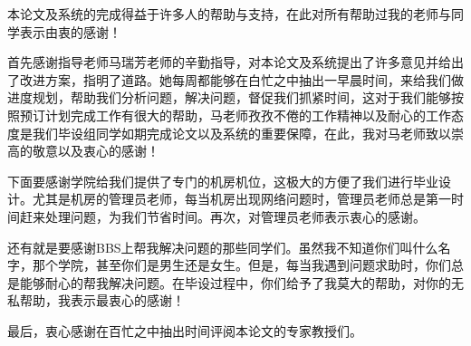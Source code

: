 \documentclass[twoside, xetex]{report}
\begin{document}
本论文及系统的完成得益于许多人的帮助与支持，在此对所有帮助过我的老师与同学表示由衷的感谢！

首先感谢指导老师马瑞芳老师的辛勤指导，对本论文及系统提出了许多意见并给出了改进方案，指明了道路。她每周都能够在白忙之中抽出一早晨时间，来给我们做进度规划，帮助我们分析问题，解决问题，督促我们抓紧时间，这对于我们能够按照预订计划完成工作有很大的帮助，马老师孜孜不倦的工作精神以及耐心的工作态度是我们毕设组同学如期完成论文以及系统的重要保障，在此，我对马老师致以崇高的敬意以及衷心的感谢！

下面要感谢学院给我们提供了专门的机房机位，这极大的方便了我们进行毕业设计。尤其是机房的管理员老师，每当机房出现网络问题时，管理员老师总是第一时间赶来处理问题，为我们节省时间。再次，对管理员老师表示衷心的感谢。

还有就是要感谢BBS上帮我解决问题的那些同学们。虽然我不知道你们叫什么名字，那个学院，甚至你们是男生还是女生。但是，每当我遇到问题求助时，你们总是能够耐心的帮我解决问题。在毕设过程中，你们给予了我莫大的帮助，对你的无私帮助，我表示最衷心的感谢！

最后，衷心感谢在百忙之中抽出时间评阅本论文的专家教授们。
\end{document}
